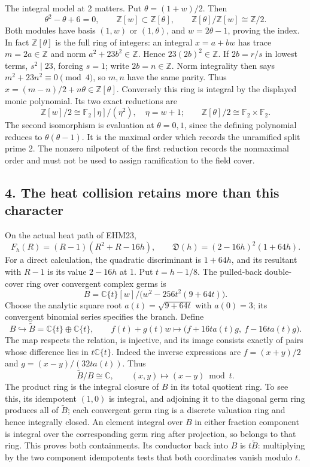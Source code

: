 \documentclass[
  10pt,
  a4paper,
]{article}
\begin{document}
The integral model at 2 matters. Put \(\theta=(1+w)/2\). Then \[
\theta^2-\theta+6=0,\qquad
\mathbb Z[w]\subset\mathbb Z[\theta],\qquad
\mathbb Z[\theta]/\mathbb Z[w]\cong\mathbb Z/2.
\tag{CBR17}
\] Both modules have basis \((1,w)\) or \((1,\theta)\), and
\(w=2\theta-1\), proving the index. In fact \(\mathbb Z[\theta]\) is the
full ring of integers: an integral \(x=a+bw\) has trace
\(m=2a\in\mathbb Z\) and norm \(a^2+23b^2\in\mathbb Z\). Hence
\(23(2b)^2\in\mathbb Z\). If \(2b=r/s\) in lowest terms, \(s^2\mid23\),
forcing \(s=1\); write \(2b=n\in\mathbb Z\). Norm integrality then says
\(m^2+23n^2\equiv0\pmod4\), so \(m,n\) have the same parity. Thus
\(x=(m-n)/2+n\theta\in\mathbb Z[\theta]\). Conversely this ring is
integral by the displayed monic polynomial. Its two exact reductions are
\[
\mathbb Z[w]/2\cong\mathbb F_2[\eta]/(\eta^2),\quad\eta=w+1;
\qquad
\mathbb Z[\theta]/2\cong\mathbb F_2\times\mathbb F_2.
\tag{CBR18}
\] The second isomorphism is evaluation at \(\theta=0,1\), since the
defining polynomial reduces to \(\theta(\theta-1)\). It is the maximal
order which records the unramified split prime 2. The nonzero nilpotent
of the first reduction records the nonmaximal order and must not be used
to assign ramification to the field cover.

\subsection{4. The heat collision retains more than this
character}\label{the-heat-collision-retains-more-than-this-character}

On the actual heat path of EHM23, \[
F_h(R)=(R-1)(R^2+R-16h),\qquad
\mathfrak D(h)=(2-16h)^2(1+64h).
\tag{CBR19}
\] For a direct calculation, the quadratic discriminant is \(1+64h\),
and its resultant with \(R-1\) is its value \(2-16h\) at 1. Put
\(t=h-1/8\). The pulled-back double-cover ring over convergent complex
germs is \[
B=\mathbb C\{t\}[w]/\bigl(w^2-256t^2(9+64t)\bigr).
\tag{CBR20}
\] Choose the analytic square root \(a(t)=\sqrt{9+64t}\) with
\(a(0)=3\); its convergent binomial series specifies the branch. Define
\[
B\hookrightarrow\widetilde B=\mathbb C\{t\}\oplus\mathbb C\{t\},
\qquad f(t)+g(t)w\longmapsto
\bigl(f+16ta(t)g,\ f-16ta(t)g\bigr).
\tag{CBR21}
\] The map respects the relation, is injective, and its image consists
exactly of pairs whose difference lies in \(t\mathbb C\{t\}\). Indeed
the inverse expressions are \(f=(x+y)/2\) and \(g=(x-y)/(32ta(t))\).
Thus \[
\widetilde B/B\cong\mathbb C,\qquad
(x,y)\longmapsto (x-y)\bmod t.
\tag{CBR22}
\] The product ring is the integral closure of \(B\) in its total
quotient ring. To see this, its idempotent \((1,0)\) is integral, and
adjoining it to the diagonal germ ring produces all of \(\widetilde B\);
each convergent germ ring is a discrete valuation ring and hence
integrally closed. An element integral over \(B\) in either fraction
component is integral over the corresponding germ ring after projection,
so belongs to that ring. This proves both containments. Its conductor
back into \(B\) is \(t\widetilde B\): multiplying by the two component
idempotents tests that both coordinates vanish modulo \(t\).
\end{document}
